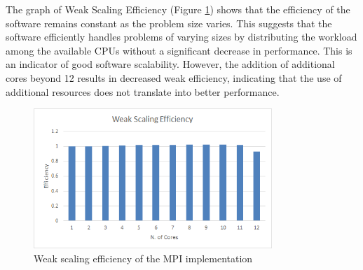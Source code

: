 \documentclass[a4paper, 12pt]{report}
\begin{document}
\begin{sloppypar}
  \newpage
  \noindent
  The graph of Weak Scaling Efficiency (Figure \ref{fig:mpi_wse}) shows that the efficiency of the software remains constant as the problem size varies. This suggests that the software efficiently handles problems of varying sizes by distributing the workload among the available CPUs without a significant decrease in performance. This is an indicator of good software scalability. However, the addition of additional cores beyond 12 results in decreased weak efficiency, indicating that the use of additional resources does not translate into better performance.

  \begin{figure}[ht]
    \centering
    \includegraphics[width=9cm]{img/mpi-wse.png}
    \caption{Weak scaling efficiency of the MPI implementation}
    \label{fig:mpi_wse}
  \end{figure}

\end{sloppypar}
\end{document}
